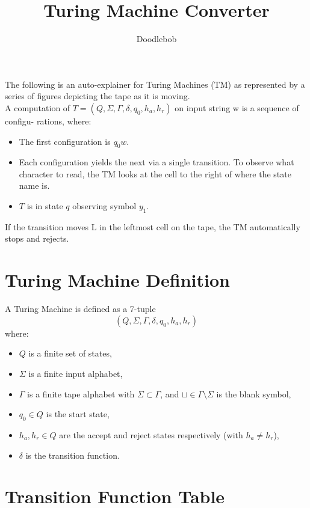 \documentclass{article}
\begin{document}
\title{\textbf{Turing Machine Converter}}
\author{Doodlebob}
\date{}
\maketitle
\thispagestyle{fancy}

The following is an auto-explainer for Turing Machines (TM) as represented by a series of figures depicting the tape as it is moving. \\

A computation of $T = (Q, \Sigma, \Gamma, \delta, q_0, h_a, h_r)$ on input string w is a sequence of configu-
rations, where:
\begin{itemize}
\item The first configuration is $q_0w$.
\item Each configuration yields the next via a single transition. To observe what character to read,
the TM looks at the cell to the right of where the state name is.
\item $T$ is in state $q$ observing symbol $y_1$.
\end{itemize}
If the transition moves L in the leftmost cell on the tape, the TM automatically stops and rejects.

\section{Turing Machine Definition}

A Turing Machine is defined as a 7-tuple 
\[
(Q, \Sigma, \Gamma, \delta, q_0, h_a, h_r)
\]
where:
\begin{itemize}
    \item $Q$ is a finite set of states,
    \item $\Sigma$ is a finite input alphabet,
    \item $\Gamma$ is a finite tape alphabet with $\Sigma \subset \Gamma$, and $\sqcup \in \Gamma \setminus \Sigma$ is the blank symbol,
    \item $q_0 \in Q$ is the start state,
    \item $h_a, h_r \in Q$ are the accept and reject states respectively (with $h_a \neq h_r$),
    \item $\delta$ is the transition function.
\end{itemize}
\def\Sym#1{\texttt{\color{BrickRed}#1}}

\section{Transition Function Table}
\end{document}
